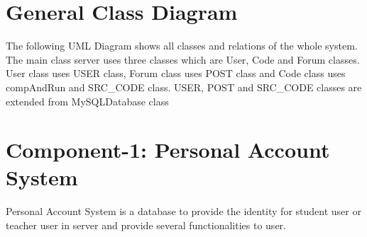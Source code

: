 \clearpage
\section{General Class Diagram}
The following UML Diagram shows all classes and relations of the whole system.\newline
The main class server uses three classes which are User, Code and Forum classes. User class uses USER class, Forum class uses POST class and Code class uses compAndRun and SRC\_CODE class. USER, POST and SRC\_CODE classes are extended from MySQLDatabase class\newline
\begin{figure}[H]
 \label{1}
 \end{figure}
\clearpage

\section{Component-1: Personal Account System}
Personal Account System is a database to provide the identity for student user or teacher user in server and provide several functionalities to user.

